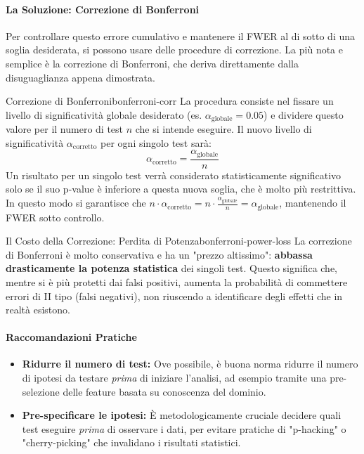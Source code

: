 \paragraph{La Soluzione: Correzione di Bonferroni}
Per controllare questo errore cumulativo e mantenere il FWER al di sotto di una soglia desiderata, si possono usare delle procedure di correzione. La più nota e semplice è la correzione di Bonferroni, che deriva direttamente dalla disuguaglianza appena dimostrata.

\begin{definizione}{Correzione di Bonferroni}{bonferroni-corr}
La procedura consiste nel fissare un livello di significatività globale desiderato (es. \(\alpha_{\text{globale}} = 0.05\)) e dividere questo valore per il numero di test \(n\) che si intende eseguire. Il nuovo livello di significatività \(\alpha_{\text{corretto}}\) per ogni singolo test sarà:
\[
\alpha_{\text{corretto}} = \frac{\alpha_{\text{globale}}}{n}
\]
Un risultato per un singolo test verrà considerato statisticamente significativo solo se il suo p-value è inferiore a questa nuova soglia, che è molto più restrittiva. In questo modo si garantisce che \(n \cdot \alpha_{\text{corretto}} = n \cdot \frac{\alpha_{\text{globale}}}{n} = \alpha_{\text{globale}}\), mantenendo il FWER sotto controllo.
\end{definizione}

\begin{nota}{Il Costo della Correzione: Perdita di Potenza}{bonferroni-power-loss}
La correzione di Bonferroni è molto conservativa e ha un "prezzo altissimo": \textbf{abbassa drasticamente la potenza statistica} dei singoli test. Questo significa che, mentre si è più protetti dai falsi positivi, aumenta la probabilità di commettere errori di II tipo (falsi negativi), non riuscendo a identificare degli effetti che in realtà esistono.
\end{nota}

\paragraph{Raccomandazioni Pratiche}
\begin{itemize}
\item \textbf{Ridurre il numero di test:} Ove possibile, è buona norma ridurre il numero di ipotesi da testare \textit{prima} di iniziare l'analisi, ad esempio tramite una pre-selezione delle feature basata su conoscenza del dominio.
\item \textbf{Pre-specificare le ipotesi:} È metodologicamente cruciale decidere quali test eseguire \textit{prima} di osservare i dati, per evitare pratiche di "p-hacking" o "cherry-picking" che invalidano i risultati statistici.
\end{itemize}
